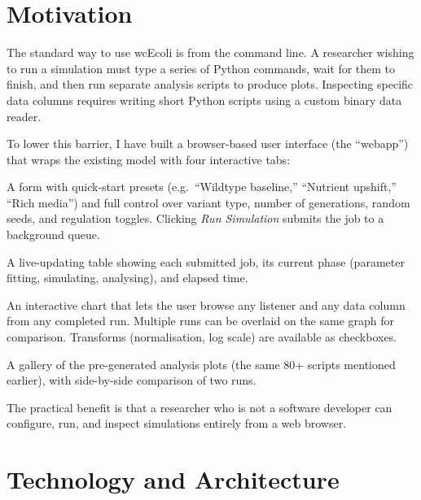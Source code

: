 \documentclass[11pt,a4paper]{article}
\begin{document}
\section{Motivation}

The standard way to use wcEcoli is from the command line.  A researcher
wishing to run a simulation must type a series of Python commands, wait for
them to finish, and then run separate analysis scripts to produce plots.
Inspecting specific data columns requires writing short Python scripts using a
custom binary data reader.

To lower this barrier, I have built a browser-based user interface (the
``webapp'') that wraps the existing model with four interactive tabs:

\begin{description}[style=nextline, leftmargin=1.5cm]
  \item[Configure]
    A form with quick-start presets (e.g.\ ``Wildtype baseline,''
    ``Nutrient upshift,'' ``Rich media'') and full control over variant
    type, number of generations, random seeds, and regulation toggles.
    Clicking \emph{Run Simulation} submits the job to a background queue.

  \item[Run Status]
    A live-updating table showing each submitted job, its current phase
    (parameter fitting, simulating, analysing), and elapsed time.

  \item[Inspect Data]
    An interactive chart that lets the user browse any listener and any
    data column from any completed run.  Multiple runs can be overlaid on
    the same graph for comparison.  Transforms (normalisation, log scale)
    are available as checkboxes.

  \item[Explore Plots]
    A gallery of the pre-generated analysis plots (the same 80+ scripts
    mentioned earlier), with side-by-side comparison of two runs.
\end{description}

The practical benefit is that a researcher who is not a software developer
can configure, run, and inspect simulations entirely from a web browser.

\section{Technology and Architecture}
\end{document}
